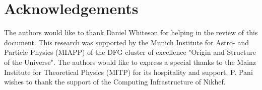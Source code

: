 \chapter{Acknowledgements}

The authors would like to thank Daniel Whiteson for helping in the review of this document. 
This research was supported by the Munich Institute for Astro- and Particle Physics (MIAPP) of the DFG cluster of excellence "Origin and Structure of the Universe".
The authors would like to express a special thanks to the Mainz Institute for Theoretical Physics (MITP) for its hospitality and support. 
P. Pani wishes to thank the support of the Computing Infrastructure of
Nikhef.
